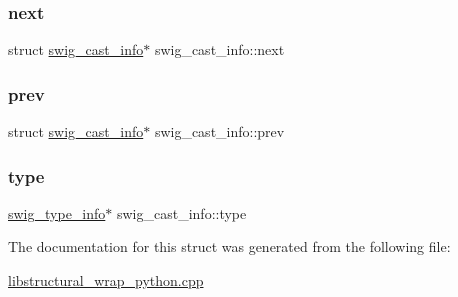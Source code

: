 \subsubsection{\texorpdfstring{next}{next}}
{\footnotesize\ttfamily struct \hyperlink{structswig__cast__info}{swig\+\_\+cast\+\_\+info}$\ast$ swig\+\_\+cast\+\_\+info\+::next}

\mbox{\label{structswig__cast__info_afc685bcf38a5a06c6601775138c5999c}} 
\subsubsection{\texorpdfstring{prev}{prev}}
{\footnotesize\ttfamily struct \hyperlink{structswig__cast__info}{swig\+\_\+cast\+\_\+info}$\ast$ swig\+\_\+cast\+\_\+info\+::prev}

\mbox{\label{structswig__cast__info_a1c9023a301c8d6806209f4e10df6e9e0}} 
\subsubsection{\texorpdfstring{type}{type}}
{\footnotesize\ttfamily \hyperlink{structswig__type__info}{swig\+\_\+type\+\_\+info}$\ast$ swig\+\_\+cast\+\_\+info\+::type}



The documentation for this struct was generated from the following file\+:\begin{DoxyCompactItemize}
\item 
\hyperlink{libstructural__wrap__python_8cpp}{libstructural\+\_\+wrap\+\_\+python.\+cpp}\end{DoxyCompactItemize}
